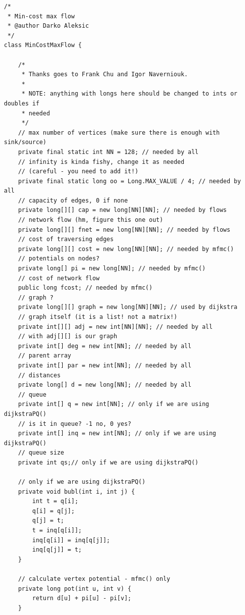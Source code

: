 \documentclass{article}
\begin{document}
    \begin{verbatim}
/*
 * Min-cost max flow
 * @author Darko Aleksic
 */
class MinCostMaxFlow {

    /*
     * Thanks goes to Frank Chu and Igor Naverniouk.
     * 
     * NOTE: anything with longs here should be changed to ints or doubles if
     * needed
     */
    // max number of vertices (make sure there is enough with sink/source)
    private final static int NN = 128; // needed by all
    // infinity is kinda fishy, change it as needed 
    // (careful - you need to add it!)
    private final static long oo = Long.MAX_VALUE / 4; // needed by all
    // capacity of edges, 0 if none
    private long[][] cap = new long[NN][NN]; // needed by flows
    // network flow (hm, figure this one out)
    private long[][] fnet = new long[NN][NN]; // needed by flows
    // cost of traversing edges
    private long[][] cost = new long[NN][NN]; // needed by mfmc()
    // potentials on nodes?
    private long[] pi = new long[NN]; // needed by mfmc()
    // cost of network flow
    public long fcost; // needed by mfmc()
    // graph ?
    private long[][] graph = new long[NN][NN]; // used by dijkstra
    // graph itself (it is a list! not a matrix!)
    private int[][] adj = new int[NN][NN]; // needed by all
    // with adj[][] is our graph
    private int[] deg = new int[NN]; // needed by all
    // parent array
    private int[] par = new int[NN]; // needed by all
    // distances
    private long[] d = new long[NN]; // needed by all
    // queue
    private int[] q = new int[NN]; // only if we are using dijkstraPQ()
    // is it in queue? -1 no, 0 yes?
    private int[] inq = new int[NN]; // only if we are using dijkstraPQ()
    // queue size
    private int qs;// only if we are using dijkstraPQ()

    // only if we are using dijkstraPQ()
    private void bubl(int i, int j) {
        int t = q[i];
        q[i] = q[j];
        q[j] = t;
        t = inq[q[i]];
        inq[q[i]] = inq[q[j]];
        inq[q[j]] = t;
    }

    // calculate vertex potential - mfmc() only
    private long pot(int u, int v) {
        return d[u] + pi[u] - pi[v];
    }

    \end{verbatim}
\end{document}
